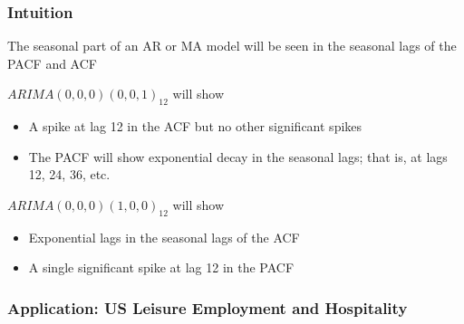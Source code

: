 \documentclass{beamer}
\begin{document}
\begin{frame}
  \frametitle{Intuition}

  The seasonal part of an AR or MA model will be seen in the seasonal lags of the PACF and ACF


  \begin{exampleblock}{$ARIMA(0,0,0)(0,0,1)_{12}$  will show}

    \begin{itemize}
    \item A spike at lag 12 in the ACF but no other significant spikes
    \item The PACF will show exponential decay in the seasonal lags; that is, at lags 12, 24, 36, etc.
    \end{itemize}
    
  \end{exampleblock}
  


  \begin{exampleblock}{$ARIMA(0,0,0)(1,0,0)_{12}$  will show}

    \begin{itemize}
    \item Exponential lags in the seasonal lags of the ACF
    \item A single significant spike at lag 12 in the PACF
    \end{itemize}
    
  \end{exampleblock}

\end{frame}


\begin{frame}
  \frametitle{Application:  US Leisure Employment and Hospitality}
\end{frame}
\end{document}
